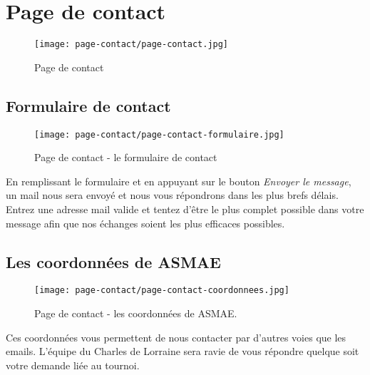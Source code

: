 \section{Page de contact}

\begin{figure}[H]
\centering
\texttt{[image: page-contact/page-contact.jpg]}
\caption{Page de contact}
\end{figure}

\subsection{Formulaire de contact}

\begin{figure}[H]
\centering
\texttt{[image: page-contact/page-contact-formulaire.jpg]}
\caption{Page de contact - le formulaire de contact}
\end{figure}

En remplissant le formulaire et en appuyant sur le bouton \textit{Envoyer le
message}, un mail nous sera envoyé et nous vous répondrons dans les plus brefs
délais. Entrez une adresse mail valide et tentez d'être le plus complet
possible dans votre message afin que nos échanges soient les plus efficaces
possibles. \newline

\subsection{Les coordonnées de ASMAE}

\begin{figure}[H]
\centering
\texttt{[image: page-contact/page-contact-coordonnees.jpg]}
\caption{Page de contact - les coordonnées de ASMAE.}
\end{figure}

Ces coordonnées vous permettent de nous contacter par d'autres voies que les
emails. L'équipe du Charles de Lorraine sera ravie de vous répondre quelque
soit votre demande liée au tournoi. \newline
